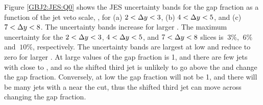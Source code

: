 Figure \ref{GBJ2:JES:Q0} shows the JES uncertainty bands for the gap fraction as a function of the jet veto scale, \qz{}, for (a) $2<\mbox{$\Delta y$}{}<3$, (b) $4<\mbox{$\Delta y$}{}<5$, and (c) $7<\mbox{$\Delta y$}{}<8$.
The uncertainty bands increase for larger \dy{}.
The maximum uncertainty for the $2<\mbox{$\Delta y$}{}<3$,  $4<\mbox{$\Delta y$}{}<5$, and  $7<\mbox{$\Delta y$}{}<8$ slices is $~3\%$, $~6\%$ and $~10\%$, respectively.
The uncertainty bands are largest at low \qz{} and reduce to zero for larger \qz{}.
At large values of \qz{} the gap fraction is 1, and there are few jets with \pt{} close to \qz{}, and so the shifted third jet is unlikely to go above the \qz{} and change the gap fraction.
Conversely, at low \qz{} the gap fraction will not be 1, and there will be many jets with a \pt{} near the \qz{} cut, thus the shifted third jet \pt{}  can move across \qz{} changing the gap fraction.


